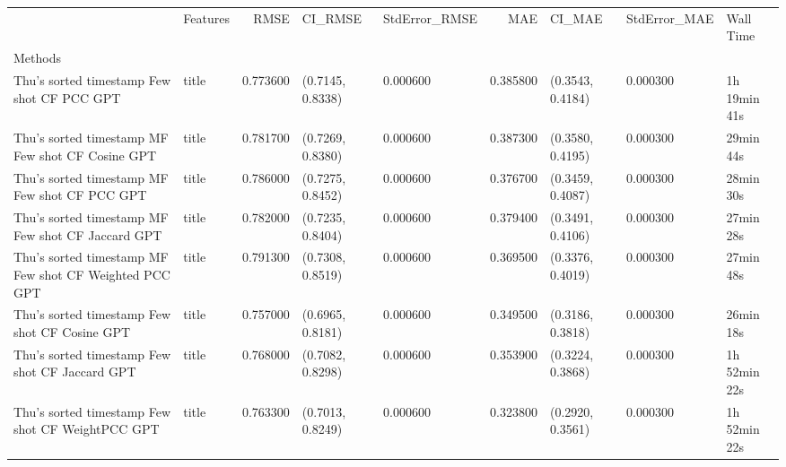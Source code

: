\begin{tabular}{llrllrlll}
 & Features & RMSE & CI_RMSE & StdError_RMSE & MAE & CI_MAE & StdError_MAE & Wall Time \\
Methods &  &  &  &  &  &  &  &  \\
Thu's sorted timestamp Few shot CF PCC GPT & title & 0.773600 & (0.7145, 0.8338) & 0.000600 & 0.385800 & (0.3543, 0.4184) & 0.000300 & 1h 19min 41s \\
Thu's sorted timestamp MF Few shot CF Cosine GPT & title & 0.781700 & (0.7269, 0.8380) & 0.000600 & 0.387300 & (0.3580, 0.4195) & 0.000300 & 29min 44s \\
Thu's sorted timestamp MF Few shot CF PCC GPT & title & 0.786000 & (0.7275, 0.8452) & 0.000600 & 0.376700 & (0.3459, 0.4087) & 0.000300 & 28min 30s \\
Thu's sorted timestamp MF Few shot CF Jaccard GPT & title & 0.782000 & (0.7235, 0.8404) & 0.000600 & 0.379400 & (0.3491, 0.4106) & 0.000300 & 27min 28s \\
Thu's sorted timestamp MF Few shot CF Weighted PCC GPT & title & 0.791300 & (0.7308, 0.8519) & 0.000600 & 0.369500 & (0.3376, 0.4019) & 0.000300 & 27min 48s \\
Thu's sorted timestamp Few shot CF Cosine GPT & title & 0.757000 & (0.6965, 0.8181) & 0.000600 & 0.349500 & (0.3186, 0.3818) & 0.000300 & 26min 18s \\
Thu's sorted timestamp Few shot CF Jaccard GPT & title & 0.768000 & (0.7082, 0.8298) & 0.000600 & 0.353900 & (0.3224, 0.3868) & 0.000300 & 1h 52min 22s \\
Thu's sorted timestamp Few shot CF WeightPCC GPT & title & 0.763300 & (0.7013, 0.8249) & 0.000600 & 0.323800 & (0.2920, 0.3561) & 0.000300 & 1h 52min 22s \\
\end{tabular}

